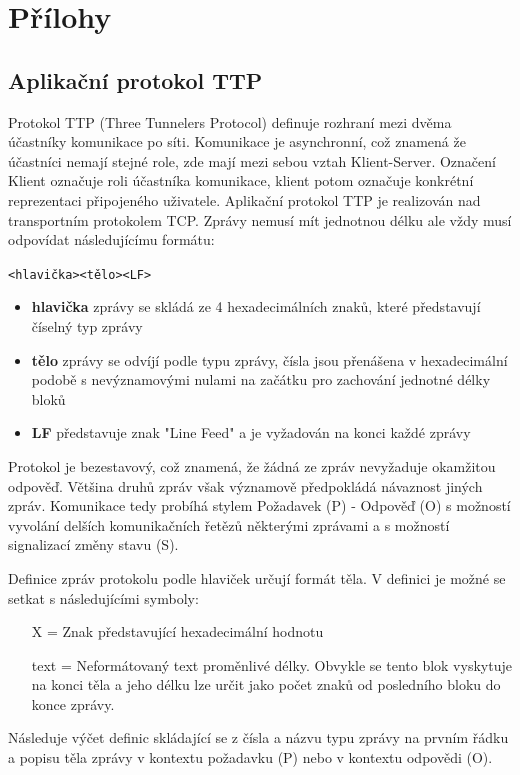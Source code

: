 \documentclass[12pt,a4paper]{article}
\let\oldsection\section
\renewcommand\section{\clearpage\oldsection}
\begin{document}
\section{Přílohy}
\subsection{Aplikační protokol TTP}
Protokol TTP (Three Tunnelers Protocol) definuje rozhraní mezi dvěma účastníky komunikace po síti. Komunikace je asynchronní, což znamená že účastníci nemají stejné role, zde mají mezi sebou vztah Klient-Server. Označení Klient označuje roli účastníka komunikace, klient potom označuje konkrétní reprezentaci připojeného uživatele.
Aplikační protokol TTP je realizován nad transportním protokolem TCP. Zprávy nemusí mít jednotnou délku ale vždy musí odpovídat následujícímu formátu:
\begin{center}
\texttt{<hlavička><tělo><LF>}
\end{center}
\begin{itemize}
\setlength\itemsep{0em}
\item \textbf{hlavička} zprávy se skládá ze 4 hexadecimálních znaků, které představují číselný typ zprávy
\item \textbf{tělo} zprávy se odvíjí podle typu zprávy, čísla jsou přenášena v hexadecimální podobě s nevýznamovými nulami na začátku pro zachování jednotné délky bloků
\item \textbf{LF} představuje znak "Line Feed" a je vyžadován na konci každé zprávy
\end{itemize}

Protokol je bezestavový, což znamená, že žádná ze zpráv nevyžaduje okamžitou odpověď. Většina druhů zpráv však významově předpokládá návaznost jiných zpráv.
Komunikace tedy probíhá stylem Požadavek (P) - Odpověď (O) s možností vyvolání delších komunikačních řetězů některými zprávami a s možností signalizací změny stavu (S).

Definice zpráv protokolu podle hlaviček určují formát těla. V definici je možné se setkat s následujícími symboly:
\begin{itemize}
\item[X] = Znak představující hexadecimální hodnotu
\item[text] = Neformátovaný text proměnlivé délky. Obvykle se tento blok vyskytuje na konci těla a jeho délku lze určit jako počet znaků od posledního bloku do konce zprávy.
\end{itemize}
Následuje výčet definic skládající se z čísla a názvu typu zprávy na prvním řádku a popisu těla zprávy v kontextu požadavku (P) nebo v kontextu odpovědi (O).
\end{document}

